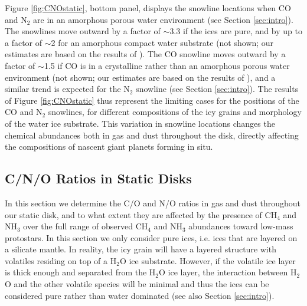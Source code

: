 \documentclass[apj]{emulateapj}
\begin{document}
Figure \ref{fig:CNOstatic}, bottom panel, displays the snowline locations when CO and N$_2$ are in an amorphous porous water environment (see Section \ref{sec:intro}).  The snowlines move outward by a factor of $\sim$3.3 if the ices are pure, and by up to a factor of $\sim$2 for an amorphous compact water substrate (not shown; our estimates are based on the results of \citealt{fayolle16}). The CO snowline moves outward by a factor of $\sim$1.5 if CO is in a crystalline rather than an amorphous porous water environment (not shown; our estimates are based on the results of \citealt{noble12}), and a similar trend is expected for the N$_2$ snowline (see Section \ref{sec:intro}). The results of Figure \ref{fig:CNOstatic} thus represent the limiting cases for the positions of the CO and N$_2$ snowlines, for different compositions of the icy grains and morphology of the water ice substrate. This variation in snowline locations changes the chemical abundances both in gas and dust throughout the disk, directly affecting the compositions of nascent giant planets forming in situ. %


\subsection{C/N/O Ratios in Static Disks}
\label{sec:static}

In this section we determine the C/O and N/O ratios in gas and dust throughout our static disk, and to what extent they are affected by the presence of CH$_4$ and NH$_3$ over the full range of observed CH$_4$ and NH$_3$ abundances toward low-mass protostars. In this section we only consider pure ices, i.e. ices that are layered on a silicate mantle. In reality, the icy grain will have a layered structure with volatiles residing on top of a H$_2$O ice substrate. However, if the volatile ice layer is thick enough and separated from the H$_2$O ice layer, the interaction between H$_2$O and the other volatile species will be minimal and thus the ices can be considered pure rather than water dominated (see also Section \ref{sec:intro}).
\end{document}
